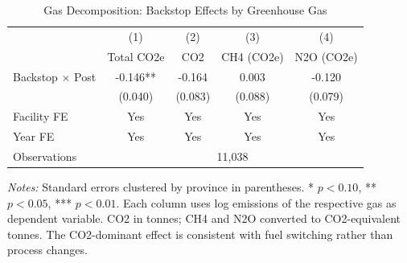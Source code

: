 \begin{table}[htbp]
\centering
\caption{Gas Decomposition: Backstop Effects by Greenhouse Gas}
\label{tab:gas}
\begin{tabular}{l cccc}
\hline\hline
 & (1) & (2) & (3) & (4) \\
 & Total CO2e & CO2 & CH4 (CO2e) & N2O (CO2e) \\
\hline
Backstop $\times$ Post & -0.146** & -0.164 & 0.003 & -0.120 \\
 & (0.040) & (0.083) & (0.088) & (0.079) \\[6pt]
\hline
Facility FE & Yes & Yes & Yes & Yes \\
Year FE & Yes & Yes & Yes & Yes \\
Observations & \multicolumn{4}{c}{11,038} \\
\hline\hline
\end{tabular}
\begin{minipage}{0.95\textwidth}
\footnotesize
\textit{Notes:} Standard errors clustered by province in parentheses. * $p<0.10$, ** $p<0.05$, *** $p<0.01$. Each column uses log emissions of the respective gas as dependent variable. CO2 in tonnes; CH4 and N2O converted to CO2-equivalent tonnes. The CO2-dominant effect is consistent with fuel switching rather than process changes.
\end{minipage}
\end{table}
